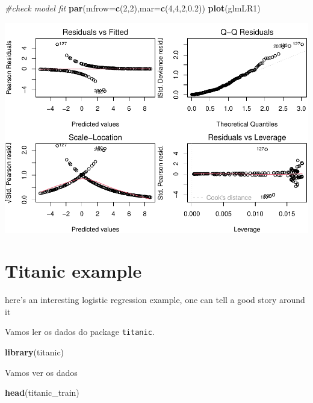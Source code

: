 \documentclass[
]{book}
\newenvironment{Shaded}{\begin{snugshade}}{\end{snugshade}}
\newcommand{\AttributeTok}[1]{\textcolor[rgb]{0.13,0.29,0.53}{#1}}
\newcommand{\CommentTok}[1]{\textcolor[rgb]{0.56,0.35,0.01}{\textit{#1}}}
\newcommand{\DecValTok}[1]{\textcolor[rgb]{0.00,0.00,0.81}{#1}}
\newcommand{\FloatTok}[1]{\textcolor[rgb]{0.00,0.00,0.81}{#1}}
\newcommand{\FunctionTok}[1]{\textcolor[rgb]{0.13,0.29,0.53}{\textbf{#1}}}
\newcommand{\NormalTok}[1]{#1}
\begin{document}
\begin{Shaded}
\begin{Highlighting}[]
\CommentTok{\#check model fit}
\FunctionTok{par}\NormalTok{(}\AttributeTok{mfrow=}\FunctionTok{c}\NormalTok{(}\DecValTok{2}\NormalTok{,}\DecValTok{2}\NormalTok{),}\AttributeTok{mar=}\FunctionTok{c}\NormalTok{(}\DecValTok{4}\NormalTok{,}\DecValTok{4}\NormalTok{,}\DecValTok{2}\NormalTok{,}\FloatTok{0.2}\NormalTok{))}
\FunctionTok{plot}\NormalTok{(glmLR1)}
\end{Highlighting}
\end{Shaded}

\includegraphics{ECOMODbook_files/figure-latex/unnamed-chunk-23-2.pdf}

\hypertarget{titanic-example}{%
\section{Titanic example}\label{titanic-example}}

here's an interesting logistic regression example, one can tell a good story around it

Vamos ler os dados do package \texttt{titanic}.

\begin{Shaded}
\begin{Highlighting}[]
\FunctionTok{library}\NormalTok{(titanic)}
\end{Highlighting}
\end{Shaded}

Vamos ver os dados

\begin{Shaded}
\begin{Highlighting}[]
\FunctionTok{head}\NormalTok{(titanic\_train)}
\end{Highlighting}
\end{Shaded}
\end{document}
